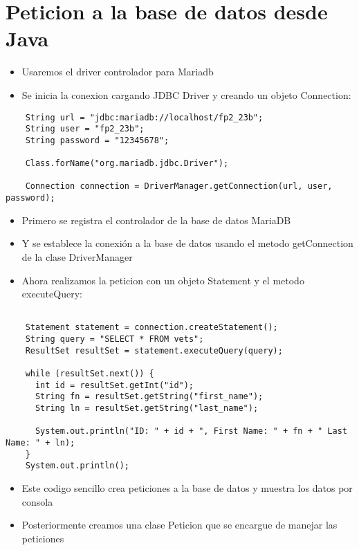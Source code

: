 \section{Peticion a la base de datos desde Java}
\begin{itemize}
  \item Usaremos el driver controlador para Mariadb
  \item Se inicia la conexion cargando JDBC Driver y creando un objeto Connection:
\end{itemize}

\begin{lstlisting}
    String url = "jdbc:mariadb://localhost/fp2_23b"; 
    String user = "fp2_23b"; 
    String password = "12345678";

    Class.forName("org.mariadb.jdbc.Driver");

    Connection connection = DriverManager.getConnection(url, user, password);
\end{lstlisting}

\begin{itemize}
  \item Primero se registra el controlador de la base de datos MariaDB
  \item Y se establece la conexión a la base de datos usando el metodo getConnection de la clase DriverManager
  \item Ahora realizamos la peticion con un objeto Statement y el metodo executeQuery:
\end{itemize}

\begin{lstlisting}

    Statement statement = connection.createStatement();
    String query = "SELECT * FROM vets";
    ResultSet resultSet = statement.executeQuery(query);

    while (resultSet.next()) {
      int id = resultSet.getInt("id");
      String fn = resultSet.getString("first_name");
      String ln = resultSet.getString("last_name");

      System.out.println("ID: " + id + ", First Name: " + fn + " Last Name: " + ln);
    }
    System.out.println();
\end{lstlisting}

\begin{itemize}
  \item Este codigo sencillo crea peticiones a la base de datos y muestra los datos por consola
  \item Posteriormente creamos una clase Peticion que se encargue de manejar las peticiones
\end{itemize}
